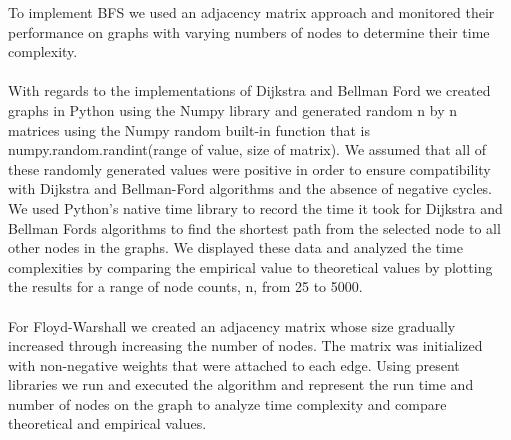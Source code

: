 \documentclass[a4paper, 12pt]{report}
\begin{document}
    To implement BFS we used an adjacency matrix approach and monitored their performance on graphs with varying numbers of nodes to determine their time complexity.\\
    \\
    With regards to the implementations of Dijkstra and Bellman Ford we created graphs in Python using the Numpy library and generated random n by n matrices using the Numpy random built-in function that is numpy.random.randint(range of value, size of matrix). We assumed that all of these randomly generated values were positive in order to ensure compatibility with Dijkstra and Bellman-Ford algorithms and the absence of negative cycles. We used Python's native time library to record the time it took for Dijkstra and Bellman Fords algorithms to find the shortest path from the selected node to all other nodes in the graphs. We displayed these data and analyzed the time complexities by comparing the empirical value to theoretical values by plotting the results for a range of node counts, n, from 25 to 5000.\\
    \\
    For Floyd-Warshall we created an adjacency matrix whose size gradually increased through increasing the number of nodes. The matrix was initialized with non-negative weights that were attached to each edge. Using present libraries we run and executed the algorithm and represent the run time and number of nodes on the graph to analyze time complexity and compare theoretical and empirical values. \\
    
\end{document}
